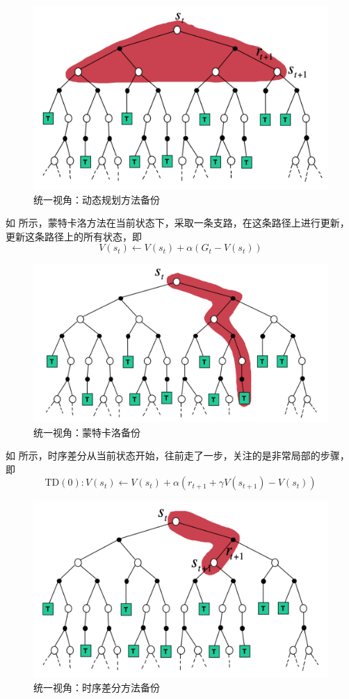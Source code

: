 \begin{figure}[htb]
	\centering
	\includegraphics[width=0.5\linewidth]{res/ch3/comparison_2}
	\caption{统一视角：动态规划方法备份}
	\label{fig:dp_backup}
\end{figure}

如 所示，蒙特卡洛方法在当前状态下，采取一条支路，在这条路径上进行更新，更新这条路径上的所有状态，即
\begin{equation}
	\label{eq:}
	V\left(s_{t}\right) \leftarrow V\left(s_{t}\right)+\alpha\left(G_{t}-V\left(s_{t}\right)\right)
\end{equation}

\begin{figure}[htb]
	\centering
	\includegraphics[width=0.5\linewidth]{res/ch3/comparison_3}
	\caption{统一视角：蒙特卡洛备份}
	\label{fig:mc_backup}
\end{figure}

如 所示，时序差分从当前状态开始，往前走了一步，关注的是非常局部的步骤，即
\begin{equation}
	\label{eq:}
	\text{TD}(0): V\left(s_{t}\right) \leftarrow V\left(s_{t}\right)+\alpha\left(r_{t+1}+\gamma V\left(s_{t+1}\right)-V\left(s_{t}\right)\right)
\end{equation}


\begin{figure}[htb]
	\centering
	\includegraphics[width=0.5\linewidth]{res/ch3/comparison_4}
	\caption{统一视角：时序差分方法备份}
	\label{fig:td_backup}
\end{figure}

